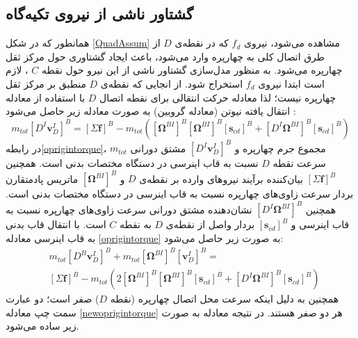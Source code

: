\subsection{گشتاور ناشی از نیروی تكیه‌گاه}
همانطور که در شكل \ref{QuadAssum} مشاهده می‌شود، نیروی
$f_d$
که در نقطه‌ی 
$D$
از طرق اتصال کلی به چهارپره وارد می‌شود، باعث ایجاد گشتاوری حول مرکز ثقل چهارپره می‌شود. به منظور مدل‌سازی گشتاور ناشی از این نیرو حول نقطه
$C$
، لازم است ابتدا نیروی
$f_d$
استخراج شود. از انجایی که نقطه‌ی
$D$
منطبق بر مرکز ثقل چهارپره نیست؛ لذا معادله حرکت انتقالی برای نقطه اتصال
$D$
با استفاده از معادله انتقال یافته نیوتن (معادله گروبین) به صورت معادله زیر حاصل می‌شود
\cite{zipfel2000modeling}
:
\begin{equation}\label{oprigintorque}
	m_{tot} \left[D^I\boldsymbol v_D^I\right]^B = 
	\left[\Sigma \boldsymbol f\right]^B-m_{tot}\left(
	\left[\boldsymbol \Omega^{BI}\right]^B
	\left[\boldsymbol\Omega^{BI}\right]^B
	\left[\boldsymbol s_{cd}\right]^B+
	\left[D^I\boldsymbol\Omega^{BI}\right]^B
	\left[\boldsymbol s_{cd}\right]^B
	\right)
\end{equation}
در رابطه\ref{oprigintorque}، 
$m_{tot}$
مجموع جرم چهارپره و 
$\left[D^I\boldsymbol v_D^I\right]^B$
مشتق دورانی سرعت نقطه
$D$
نسبت به قاب اینرسی در دستگاه مختصات بدنی است. همچنین
$\left[\Sigma \boldsymbol f\right]^B$
بیان‌کننده برآیند نیروهای وارده بر نقطه‌ی
$D$
و
$\left[\boldsymbol\Omega^{BI}\right]^B$
ماتریس پادمتقارن بردار سرعت زاوی‌های چهارپره نسبت به قاب اینرسی در دستگاه مختصات بدنی است. همچنین
$\left[D^I\boldsymbol \Omega^{BI}\right]^B$
نشان‌دهنده مشتق دورانی سرعت زاوی‌های چهارپره نسبت به قاب اینرسی و 
$\left[\boldsymbol s_{cd}\right]^B$
بردار واصل از نقطه‌ی
$D$
به نقطه
$C$
است. با انتقال قاب بدنی به قاب اینرسی معادله 
\ref{oprigintorque}
به صورت زیر حاصل می‌شود:
\begin{equation}
\begin{split}\label{newoprigintorque}
	&m_{tot} \left[D^B\boldsymbol v_D^I\right]^B +
	m_{tot}\left[\boldsymbol\Omega^{BI}\right]^B
	\left[\boldsymbol v_D^{I}\right]^B = \\
	&\left[\Sigma \boldsymbol f\right]^B-m_{tot}\left(2
	\left[\boldsymbol\Omega^{BI}\right]^B
	\left[\boldsymbol\Omega^{BI}\right]^B
	\left[\boldsymbol s_{cd}\right]^B+
	\left[D^I\boldsymbol\Omega^{BI}\right]^B
	\left[\boldsymbol s_{cd}\right]^B
	\right)
\end{split}
\end{equation}
همچنین به دلیل اینكه سرعت محل اتصال چهارپره (نقطه
$D$)
صفر است؛ دو عبارت سمت چپ معادله
\ref{newoprigintorque} 
هر دو صفر هستند. در نتیجه معادله به صورت زیر ساده می‌شود.
